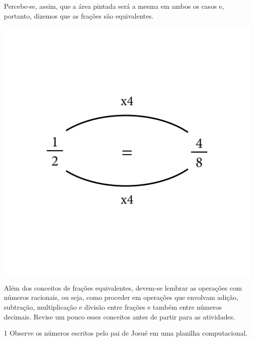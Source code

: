 {Percebe-se, assim, que a área pintada será a mesma em ambos os casos e,
portanto, dizemos que as frações são equivalentes.

\includegraphics[width=\textwidth]{../ilustracoes/MAT5/SAEB_5ANO_MAT_figura85-3.png}

Além dos conceitos de frações equivalentes, devem-se lembrar as operações
com números racionais, ou seja, como proceder em operações que envolvam
adição, subtração, multiplicação e divisão entre frações e também entre
números decimais. Revise um pouco esses conceitos antes de partir para as atividades.}


\num{1} Observe os números escritos pelo pai de Josué em uma planilha computacional.

